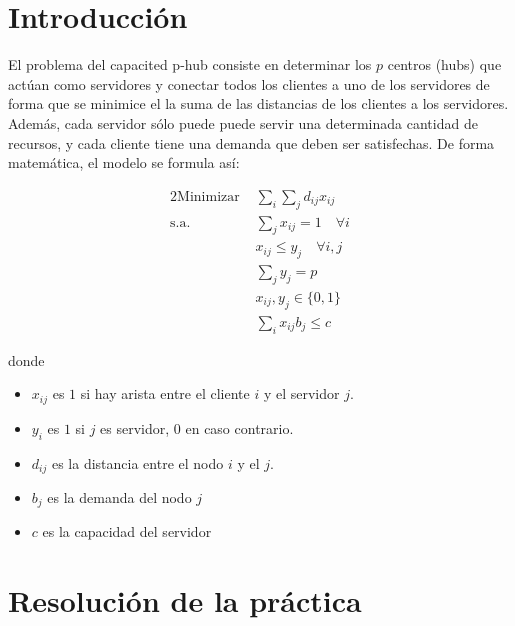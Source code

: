 \documentclass[11pt,a4paper,twoside,openright,titlepage,final]{article}
\author{José Ignacio Escribano}
\begin{document}
\setcounter{page}{1}


\listoftables
\thispagestyle{empty}
\newpage

\tableofcontents
\thispagestyle{empty}
\newpage


\setcounter{page}{1}

\section{Introducción}

El problema del capacited p-hub consiste en determinar los $p$ centros (hubs) que actúan como servidores y conectar todos los clientes a uno de los servidores de forma que se minimice el la suma de las distancias de los clientes a los servidores. Además, cada servidor sólo puede puede servir una determinada cantidad de recursos, y cada cliente tiene una demanda que deben ser satisfechas. De forma matemática, el modelo se formula así:

\begin{alignat*}{2}
\text{Minimizar }   & \sum_{i} \sum_{j} d_{ij}x_{ij}  \\
\text{s.a. } &  \sum_{j} x_{ij} = 1 \quad \forall i\\
&  x_{ij} \leq y_j \quad \forall i,j\\
& \sum_{j} y_j = p \\
& x_{ij}, y_j \in \{0,1\} \\
& \sum_{i} x_{ij} b_j \leq c
\end{alignat*}

donde

\begin{itemize}
	\item $x_{ij}$ es $1$ si hay arista entre el cliente $i$ y el servidor $j$.
	\item $y_i$ es $1$  si $j$ es servidor, $0$ en caso contrario.
	\item $d_{ij}$ es la distancia entre el nodo $i$ y el $j$.
	\item $b_j$ es la demanda del nodo $j$
	\item $c$ es la capacidad del servidor
\end{itemize}

\section{Resolución de la práctica}
\end{document}
